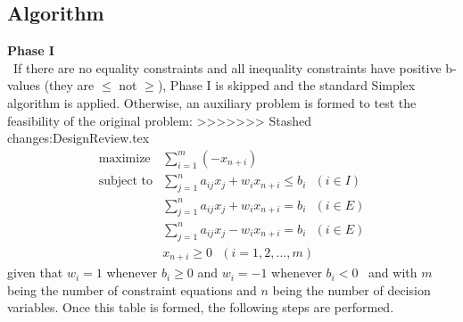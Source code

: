 \documentclass[11pt]{article}
\begin{document}
\subsection{Algorithm}
\textbf{Phase I}\\
~\indent If there are no equality constraints and all inequality constraints 
have positive b-values (they are $\leq$ not $\geq$), Phase I is skipped and 
the standard Simplex algorithm is applied. 
Otherwise, an auxiliary problem is formed to test the feasibility of the original problem:
>>>>>>> Stashed changes:DesignReview.tex
\begin{eqnarray*}
\mbox{maximize}& \sum\limits_{i=1}^m (-x_{n+i})\\
\mbox{subject to}& \sum\limits_{j=1}^n a_{ij}x_j + w_ix_{n+i} \leq b_i\mbox{\ \ }(i \in I)\\
 & \sum\limits_{j=1}^n a_{ij}x_j + w_ix_{n+i} = b_i\mbox{\ \ }(i \in E)\\
 & \sum\limits_{j=1}^n a_{ij}x_j - w_ix_{n+i} = b_i\mbox{\ \ }(i \in E)\\
 & x_{n+i} \geq 0\mbox{\ \ }(i = 1, 2,...,m)
\end{eqnarray*}
given that $w_i = 1$ whenever $b_i \geq 0$ and $w_i = -1$ whenever $b_i < 0$~\cite{chvatal83} and with $m$ being the number of constraint equations and $n$ being the number of decision variables. Once this table is formed, the following steps are performed.
\end{document}
